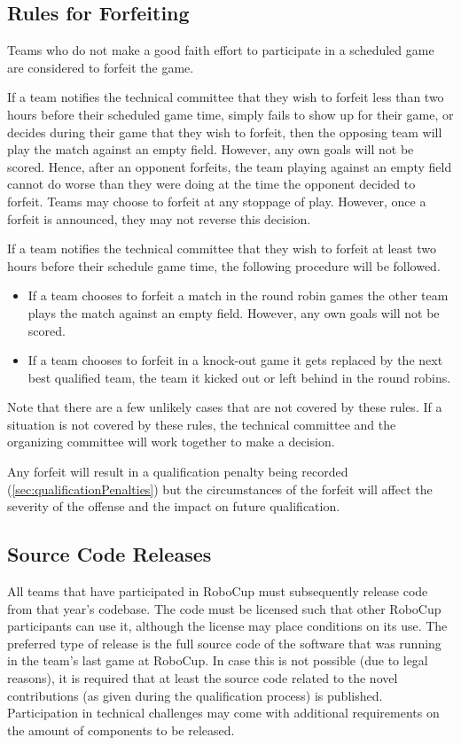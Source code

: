 \subsection{Rules for Forfeiting}
\label{sec:forfeit}

Teams who do not make a good faith effort to participate in a scheduled game are considered to forfeit the game.

If a team notifies the technical committee that they wish to forfeit less than two hours before their scheduled game time, simply fails to show up for their game, or decides during their game that they wish to forfeit, then the opposing team will play the match against an empty field.
However, any own goals will not be scored.
Hence, after an opponent forfeits, the team playing against an empty field cannot do worse than they were doing at the time the opponent decided to forfeit.
Teams may choose to forfeit at any stoppage of play.
However, once a forfeit is announced, they may not reverse this decision.

If a team notifies the technical committee that they wish to forfeit at least two hours before their schedule game time, the following procedure will be followed.
\begin{itemize}
  \item If a team chooses to forfeit a match in the round robin games the other team plays the match against an empty field.
    However, any own goals will not be scored.
  \item If a team chooses to forfeit in a knock-out game it gets replaced by the next best qualified team, \ie the team it kicked out or left behind in the round robins.
\end{itemize}

Note that there are a few unlikely cases that are not covered by these rules.
If a situation is not covered by these rules, the technical committee and the organizing committee will work together to make a decision.

Any forfeit will result in a qualification penalty being recorded (\cf \cref{sec:qualificationPenalties}) but the circumstances of the forfeit will affect the severity of the offense and the impact on future qualification.

\subsection{Source Code Releases}
\label{sec:source_code_releases}

All teams that have participated in RoboCup must subsequently release code from that year's codebase.
The code must be licensed such that other RoboCup participants can use it, although the license may place conditions on its use.
The preferred type of release is the full source code of the software that was running in the team's last game at RoboCup.
In case this is not possible (\eg due to legal reasons), it is required that at least the source code related to the novel contributions (as given during the qualification process) is published.
Participation in technical challenges may come with additional requirements on the amount of components to be released.

